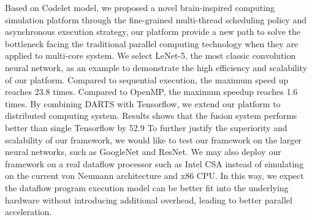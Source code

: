 Based on Codelet model, we proposed a novel brain-inspired computing simulation platform through the fine-grained multi-thread scheduling policy and asynchronous execution strategy, our platform provide a new path to solve the bottleneck facing the traditional parallel computing technology when they are applied to multi-core system.
We select LeNet-5, the most classic convolution neural network, as an example to demonstrate the high efficiency and scalability of our platform. Compared to sequential execution, the maximum speed up reaches 23.8 times. Compared to OpenMP, the maximum speedup reaches 1.6 times. By combining DARTS with Tensorflow, we extend our platform to distributed computing system. Results shows that the fusion system performs better than single Tensorflow by 52.9%
To further justify the superiority and scalability of our framework, we would like to test our framework on the larger neural networks, such as GoogleNet and ResNet. We may also deploy our framework on a real dataflow processor such as Intel CSA instead of simulating on the current von Neumann architecture and x86 CPU. In this way, we expect the dataflow program execution model can be better fit into the underlying hardware without introducing additional overhead, leading to better parallel acceleration.
